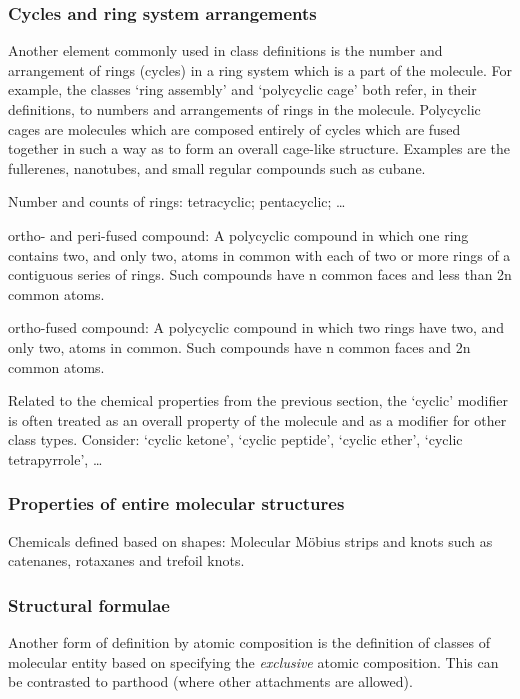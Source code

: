 \documentclass[10pt]{bmc_article}
\newenvironment{bmcformat}{\baselineskip20pt\sloppy\setboolean{publ}{false}}{\baselineskip20pt\sloppy}
\begin{document}
\begin{bmcformat}
\subsubsection*{Cycles and ring system arrangements}

Another element commonly used in class definitions is the number and arrangement of rings (cycles) in a ring system which is a part of the molecule. For example, the classes `ring assembly' and `polycyclic cage' both refer, in their definitions, to numbers and arrangements of rings in the molecule. Polycyclic cages are molecules which are composed entirely of cycles which are fused together in such a way as to form an overall cage-like structure.  Examples are the fullerenes, nanotubes, and small regular compounds such as cubane. 

Number and counts of rings: tetracyclic; pentacyclic; \ldots

ortho- and peri-fused compound: A polycyclic compound in which one ring contains two, and only two, atoms in common with each of two or more rings of a contiguous series of rings. Such compounds have n common faces and less than 2n common atoms.

ortho-fused compound: A polycyclic compound in which two rings have two, and only two, atoms in common. Such compounds have n common faces and 2n common atoms.

Related to the chemical properties from the previous section, the `cyclic' modifier is often treated as an overall property of the molecule and as a modifier for other class types. Consider: `cyclic ketone', `cyclic peptide', `cyclic ether', `cyclic tetrapyrrole', \ldots


\subsubsection*{Properties of entire molecular structures}

Chemicals defined based on shapes: Molecular M\"{o}bius strips and knots such as catenanes, rotaxanes and trefoil knots. 



\subsubsection*{Structural formulae}
\label{sec:molformula}

Another form of definition by atomic composition is the definition of classes of molecular entity based on specifying the \textit{exclusive} atomic composition.  This can be contrasted to parthood (where other attachments are allowed). 


\end{bmcformat}
\end{document}
